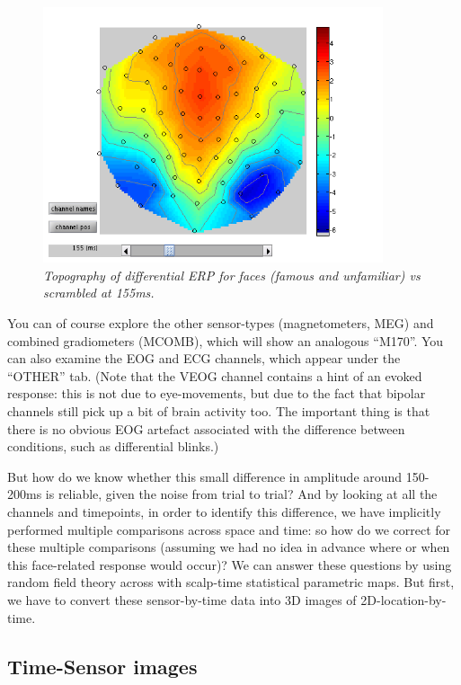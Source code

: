 \begin{figure}
\begin{center}
\includegraphics[width=100mm]{multi/figures/figure4}
\caption{\em Topography of differential ERP for faces (famous and unfamiliar) vs scrambled at 155ms. \label{multi:fig:4}}
\end{center}
\end{figure}

You can of course explore the other sensor-types (magnetometers, MEG) and combined gradiometers (MCOMB), which will show an analogous ``M170''. You can also examine the EOG and ECG channels, which appear under the ``OTHER'' tab. (Note that the VEOG channel contains a hint of an evoked response: this is not due to eye-movements, but due to the fact that bipolar channels still pick up a bit of brain activity too. The important thing is that there is no obvious EOG artefact associated with the difference between conditions, such as differential blinks.)

But how do we know whether this small difference in amplitude around 150-200ms is reliable, given the noise from trial to trial? And by looking at all the channels and timepoints, in order to identify this difference, we have implicitly performed multiple comparisons across space and time: so how do we correct for these multiple comparisons (assuming we had no idea in advance where or when this face-related response would occur)? We can answer these questions by using random field theory across with scalp-time statistical parametric maps. But first, we have to convert these sensor-by-time data into 3D images of 2D-location-by-time.

\subsection{Time-Sensor images}

